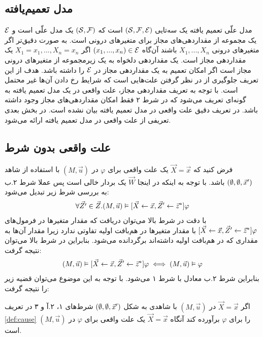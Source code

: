 \subsection{مدل تعمیم‌یافته}
مدل علّی تعمیم یافته
یک سه‌تایی
$(\mathcal{S},\mathcal{F},\mathcal{E})$
است که
$(\mathcal{S},\mathcal{F})$
یک مدل علّی است و
$\mathcal{E}$
یک مجموعه از مقداردهی‌های مجاز
برای متغیر‌های درونی است.
به صورت دقیق‌تر اگر متغیر‌های درونی
$X_1,...,X_n$
باشند آن‌گاه
$(x_1,...,x_n) \in \mathcal{E}$
اگر
$X_1=x_1,...,X_n=x_n$
یک مقداردهی مجاز است.
یک مقداردهی دلخواه به یک زیرمجموعه از متغیر‌های درونی مجاز است اگر امکان تعمیم به یک مقداردهی مجاز در
$\mathcal{E}$
را داشته باشد.
هدف از این تعریف جلوگیری از در نظر گرفتن علت‌هایی است که شرایط رخ دادن آن‌ها غیر محتمل است.
با توجه به تعریف مقداردهی مجاز، علت واقعی در یک مدل تعمیم یافته به گونه‌ای تعریف می‌شود که در شرط ۲ فقط امکان مقداردهی‌های مجاز وجود داشته باشد.
در
\cite{hp}
تعریف دقیق علت واقعی در مدل تعمیم یافته بیان نشده است.
در بخش بعدی تعریفی از علت واقعی در مدل تعمیم یافته ارائه می‌شود.

\subsection{علت واقعی بدون شرط}
فرض کنید که
$\vec X = \vec x$
یک علت واقعی برای
$\varphi$
در
$(M,\vec u)$
با استفاده از شاهد
$(\emptyset,\emptyset,\vec x')$
باشد.
با توجه به اینکه در اینجا
$\vec W$
یک بردار خالی است پس عملا شرط ۲.ب به بررسی شرط زیر تبدیل می‌شود:
\begin{align*}
      \forall \vec{Z'}\in \vec{Z}.
      (M,\vec{u})\vDash [\vec X\leftarrow\vec x,\vec{Z}'\leftarrow \vec{z}^*]\varphi
\end{align*}
با دقت در شرط بالا می‌توان دریافت که مقدار متغیر‌ها در فرمول‌های
$[\vec X\leftarrow\vec x,\vec{Z}'\leftarrow \vec{z}^*]\varphi $
با مقدار متغیر‌ها در هم‌بافت اولیه تفاوتی ندارد زیرا مقدار آن‌ها به مقداری که در هم‌بافت اولیه داشته‌اند برگردانده می‌شود.
بنابراین در شرط بالا می‌توان نتیجه گرفت:
\begin{align*}
      (M,\vec{u})\vDash [\vec X\leftarrow\vec x,\vec{Z}'\leftarrow \vec{z}^*]\varphi 
      \iff (M,\vec{u}) \vDash \varphi
\end{align*}
بنابراین شرط ۲.ب معادل با شرط ۱ می‌شود.
با توجه به این موضوع می‌توان قضیه زیر را نتیجه گرفت:
\begin{proposition}
      \label{prop:but-for}
     اگر 
     $\vec X = \vec x$
     در 
     $(M,\vec u)$
     با شاهدی به شکل
     $(\emptyset,\emptyset,\vec x')$
     شرط‌های ۱، ۲.آ و ۳ در تعریف 
     \ref{def:cause}
     را برای 
     $\varphi$
     برآورده کند آنگاه 
     $\vec X = \vec x$
     یک علت واقعی برای 
     $\varphi$
     در 
     $(M,\vec u)$
     است.
\end{proposition}
